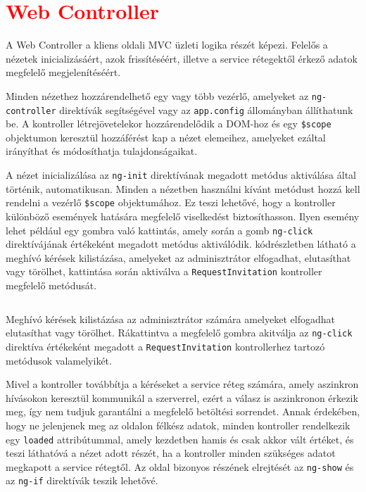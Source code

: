 \section{\textcolor{red}{Web Controller}}
\label{sec:webController}
A Web Controller a kliens oldali MVC üzleti logika részét képezi. Felelős a nézetek inicializásáért, azok frissítéséért, illetve a service rétegektől érkező adatok megfelelő megjelenítéséért. 

Minden nézethez hozzárendelhető egy vagy több vezérlő, amelyeket az \texttt{ng-controller} direktívák segítségével vagy az \texttt{app.config} állományban állíthatunk be. A kontroller létrejövetelekor hozzárendelődik a DOM-hoz és egy \texttt{\$scope} objektumon keresztül hozzáférést kap a nézet elemeihez, amelyeket ezáltal irányíthat és módosíthatja tulajdonságaikat. 

A nézet inicializálása az \texttt{ng-init} direktívának megadott metódus aktiválása által történik, automatikusan. Minden a nézetben használni kívánt metódust hozzá kell rendelni a vezérlő \texttt{\$scope}  objektumához. Ez teszi lehetővé, hogy a kontroller különböző események hatására megfelelő viselkedést biztosíthasson. Ilyen esemény lehet például egy gombra való kattintás, amely során a gomb \texttt{ng-click} direktívájának értékeként megadott metódus aktiválódik.  kódrészletben látható a meghívó kérések kilistázása, amelyeket az adminisztrátor elfogadhat, elutasíthat vagy törölhet, kattintása során aktiválva a \texttt{RequestInvitation} kontroller megfelelő metódusát.

\begin{listing}
  \inputminted[fontsize=\small]{html}{progfiles/ngClick.html}
  \caption{Meghívó kérések kilistázása az adminisztrátor számára\protect{,} amelyeket elfogadhat\protect{,} elutasíthat vagy törölhet. Rákattintva a megfelelő gombra akitválja az \texttt{ng-click} direktíva értékeként megadott\protect{,} a \texttt{RequestInvitation} kontrollerhez tartozó metódusok valamelyikét.}
  \label{lst:ngClick}
\end{listing}

Mivel a kontroller továbbítja a kéréseket a service réteg számára, amely aszinkron hívásokon keresztül kommunikál a szerverrel, ezért a válasz is aszinkronon érkezik meg, így nem tudjuk garantálni a megfelelő betöltési sorrendet. Annak érdekében, hogy ne jelenjenek meg az oldalon félkész adatok, minden kontroller rendelkezik egy \texttt{loaded} attribútummal, amely kezdetben hamis és csak akkor vált értéket, és teszi láthatóvá a nézet adott részét, ha a kontroller minden szükséges adatot megkapott a service rétegtől. Az oldal bizonyos részének elrejtését az  \texttt{ng-show} és az \texttt{ng-if} direktívák teszik lehetővé. 

